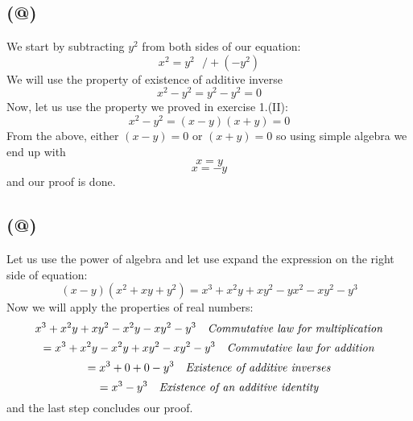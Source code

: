 \documentclass{article}
\makeatletter
\newcommand*{\rom}[1]{\expandafter\@slowromancap\romannumeral #1@}
\makeatother
\begin{document}
\subsection*{(\rom{3})}
We start by subtracting \(y^2\) from both sides of our equation: 
\begin{equation*}
	x^2 = y^2  \ \ \ / +(-y^2) 
\end{equation*}
We will use the property of  existence of additive inverse
\begin{equation*}
	x^2 - y^2 = y^2 - y^2 = 0
\end{equation*}
Now, let us use the property we proved in exercise 1.(II):
\begin{equation*}
	x^2 - y^2 = (x-y)(x+y) = 0
\end{equation*}
From the above, either \((x-y)=0\) or \((x+y) = 0\) so using simple algebra we
end up with
\begin{equation*}
	x = y
\end{equation*}
\begin{equation*}
	x = -y
\end{equation*}
and our proof is done.



\subsection*{(\rom{4})}
Let us use the power of algebra and let use expand the expression on the right
side of equation:
\begin{equation*}
	(x-y)(x^2 + xy + y^2) = x^{3} + x^{2}y + xy^{2} - yx^{2} - xy^{2} -
	y^{3}
\end{equation*}
Now we will apply the properties of real numbers:
\begin{equation*}
	x^{3} + x^{2}y + xy^{2} - x^{2}y - xy^{2} -
	y^{3} \ \ \  \mbox{\emph{Commutative law for multiplication}}
\end{equation*}
\begin{equation*}	
	=x^{3} + x^{2}y - x^{2}y + xy^{2} - xy^{2} -
	y^{3} \ \ \  \mbox{\emph{Commutative law for addition}}
\end{equation*}
\begin{equation*}	
	=x^{3} + 0 + 0 -
	y^{3} \ \ \  \mbox{\emph{Existence of additive inverses}}
\end{equation*}
\begin{equation*}	
	=x^{3} - y^{3} \ \ \  \mbox{\emph{Existence of an additive identity}}
\end{equation*}
and the last step concludes our proof.
\end{document}
